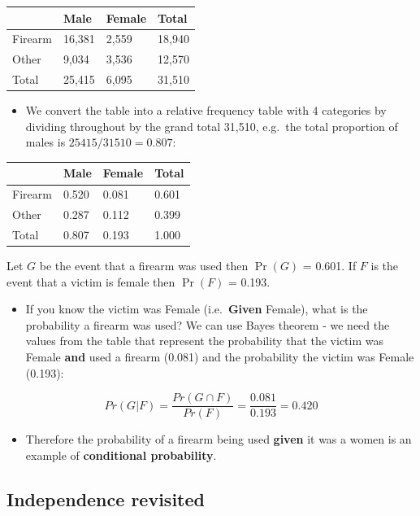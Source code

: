 \documentclass[
  oneside]{krantz}
\providecommand{\tightlist}{%
  \setlength{\itemsep}{0pt}\setlength{\parskip}{0pt}}
\begin{document}
\begin{longtable}[]{@{}llll@{}}
\toprule
& Male & Female & Total\tabularnewline
\midrule
\endhead
Firearm & 16,381 & 2,559 & 18,940\tabularnewline
Other & 9,034 & 3,536 & 12,570\tabularnewline
Total & 25,415 & 6,095 & 31,510\tabularnewline
\bottomrule
\end{longtable}

\begin{itemize}
\tightlist
\item
  We convert the table into a relative frequency table with 4 categories by dividing throughout by the grand total 31,510, e.g.~the total proportion of males is \(25415/31510 = 0.807\):
\end{itemize}

\begin{longtable}[]{@{}llll@{}}
\toprule
& Male & Female & Total\tabularnewline
\midrule
\endhead
Firearm & 0.520 & 0.081 & 0.601\tabularnewline
Other & 0.287 & 0.112 & 0.399\tabularnewline
Total & 0.807 & 0.193 & 1.000\tabularnewline
\bottomrule
\end{longtable}

Let \(G\) be the event that a firearm was used then \(\Pr(G)\) = 0.601. If \(F\) is the event that a victim is female then \(\Pr(F)\) = 0.193.

\begin{itemize}
\tightlist
\item
  If you know the victim was Female (i.e.~\textbf{Given} Female), what is the probability a firearm was used? We can use Bayes theorem - we need the values from the table that represent the probability that the victim was Female \textbf{and} used a firearm (0.081) and the probability the victim was Female (0.193):
\end{itemize}

\[Pr(G|F) = \frac{Pr(G \cap F)} {Pr(F)} = \frac{0.081}{0.193} = 0.420\]

\begin{itemize}
\tightlist
\item
  Therefore the probability of a firearm being used \textbf{given} it was a women
  is an example of \textbf{conditional probability}.
\end{itemize}

\hypertarget{independence-revisited}{%
\subsection{Independence revisited}\label{independence-revisited}}
\end{document}
